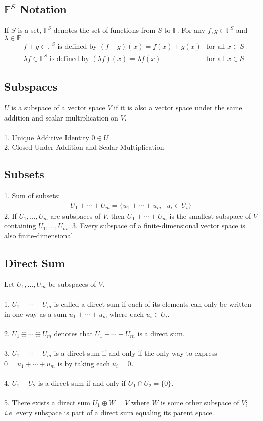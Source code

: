\documentclass[11pt,reqno]{article}
\newcommand{\F}{\mathbb{F}}
\theoremstyle{definition}
\begin{document}
\subsection*{$\F^S$ Notation}
If $S$ is a set, $\F^S$ denotes the set of functions from $S$ to $\F$. For any $f,g\in\F^S$ and $\lambda\in\F$
\begin{align*}
    &f + g \in\F^S \text{ is defined by } (f+g)(x) = f(x) + g(x) & \text{for all $x\in S$}\\
    &\lambda f\in\F^S \text{ is defined by } (\lambda f)(x) = \lambda f(x) & \text{for all $x\in S$}
\end{align*}

\subsection*{Subspaces}
$U$ is a subspace of a vector space $V$ if it is also a vector space under the same addition and scalar multiplication on $V$.\\\\
1. Unique Additive Identity $0\in U$\\
2. Closed Under Addition and Scalar Multiplication

\subsection*{Subsets}
1. Sum of subsets:
\begin{align*}
    U_1 + \cdots + U_m = \{u_1 + \cdots + u_m\ |\ u_i\in U_i\}
\end{align*}
2. If $U_1,\ldots,U_m$ are subspaces of $V$, then $U_1+\cdots+U_m$ is the smallest subspace of $V$ containing $U_1,\ldots,U_m$.
3. Every subspace of a finite-dimensional vector space is also finite-dimensional

\subsection*{Direct Sum}
Let $U_1,\ldots,U_m$ be subspaces of $V$.\\\\
1. $U_1+\cdots+U_m$ is called a direct sum if each of its elements can only be written in one way as a sum $u_1+\cdots+u_m$ where each $u_i\in U_i$.\\\\
2. $U_1\oplus\cdots\oplus U_m$ denotes that $U_1+\cdots + U_m$ is a direct sum.\\\\
3. $U_1+\cdots +U_m$ is a direct sum if and only if the only way to express $0 = u_1+\cdots+u_m$ is by taking each $u_i = 0$.\\\\
4. $U_1 + U_2$ is a direct sum if and only if $U_1 \cap U_2 = \{0\}$.\\\\
5. There exists a direct sum $U_1 \oplus W = V$ where $W$ is some other subspace of $V$; \emph{i.e.} every subspace is part of a direct sum equaling its parent space.
\end{document}
